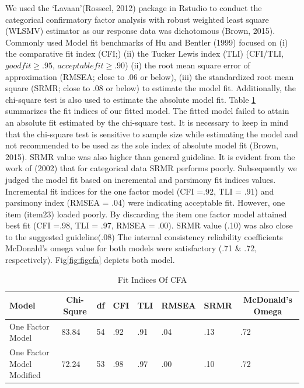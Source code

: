 \documentclass[
  english,
  man]{apa6}
\begin{document}
We used the `Lavaan'(Rosseel, 2012) package in Rstudio to conduct the categorical confirmatory factor analysis with robust weighted least square (WLSMV) estimator as our response data was dichotomous (Brown, 2015). Commonly used Model fit benchmarks of Hu and Bentler (1999) focused on (i) the comparative fit index (CFI;) (ii) the Tucker Lewis index (TLI) (CFI/TLI, \(goodfit \geq .95\), \(acceptable fit\geq .90\)) (ii) the root mean square error of approximation (RMSEA; close to .06 or below), (iii) the standardized root mean square (SRMR; close to .08 or below) to estimate the model fit. Additionally, the chi-square test is also used to estimate the absolute model fit. Table \ref{tab:tabCfa} summarizes the fit indices of our fitted model. The fitted model failed to attain an absolute fit estimated by the chi-square test. It is necessary to keep in mind that the chi-square test is sensitive to sample size while estimating the model and not recommended to be used as the sole index of absolute model fit (Brown, 2015). SRMR value was also higher than general guideline. It is evident from the work of (2002) that for categorical data SRMR performs poorly. Subsequently we judged the model fit based on incremental and parsimony fit indices values. Incremental fit indices for the one factor model (CFI =.92, TLI = .91) and parsimony index (RMSEA = .04) were indicating acceptable fit. However, one item (item23) loaded poorly. By discarding the item one factor model attained best fit (CFI =.98, TLI = .97, RMSEA = .00). SRMR value (.10) was also close to the suggested guideline(.08) The internal consistency reliability coefficients McDonald's omega value for both models were satisfactory (.71 \& .72, respectively). Fig\ref{fig:figcfa} depicts both model.

\begin{table}[tbp]

\begin{center}
\begin{threeparttable}

\caption{\label{tab:tabCfa}Fit Indices Of CFA}

\begin{tabular}{llllllll}
\toprule
Model & \multicolumn{1}{c}{Chi-Squre} & \multicolumn{1}{c}{df} & \multicolumn{1}{c}{CFI} & \multicolumn{1}{c}{TLI} & \multicolumn{1}{c}{RMSEA} & \multicolumn{1}{c}{SRMR} & \multicolumn{1}{c}{McDonald's Omega}\\
\midrule
One Factor Model & 83.84 & 54 & .92 & .91 & .04 & .13 & .72\\
One Factor Model Modified & 72.24 & 53 & .98 & .97 & .00 & .10 & .72\\
\bottomrule
\end{tabular}

\end{threeparttable}
\end{center}

\end{table}
\end{document}
